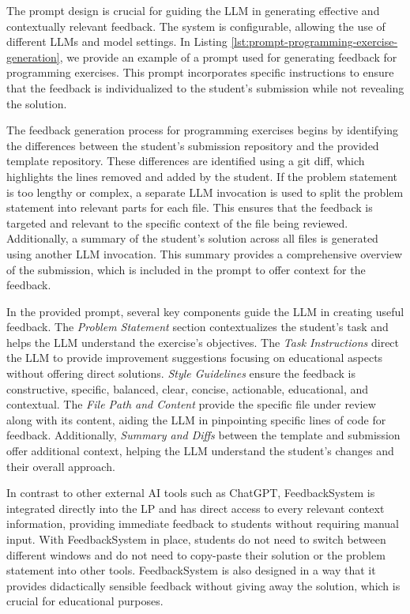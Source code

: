 \documentclass[sigconf,screen,review,anonymous]{acmart}
\begin{document}
The prompt design is crucial for guiding the LLM in generating effective and contextually relevant feedback.
The system is configurable, allowing the use of different LLMs and model settings. 
In Listing \ref{lst:prompt-programming-exercise-generation}, we provide an example of a prompt used for generating feedback for programming exercises. 
This prompt incorporates specific instructions to ensure that the feedback is individualized to the student's submission while not revealing the solution.

The feedback generation process for programming exercises begins by identifying the differences between the student's submission repository and the provided template repository. 
These differences are identified using a git diff, which highlights the lines removed and added by the student. 
If the problem statement is too lengthy or complex, a separate LLM invocation is used to split the problem statement into relevant parts for each file. 
This ensures that the feedback is targeted and relevant to the specific context of the file being reviewed. 
Additionally, a summary of the student's solution across all files is generated using another LLM invocation. 
This summary provides a comprehensive overview of the submission, which is included in the prompt to offer context for the feedback.

In the provided prompt, several key components guide the LLM in creating useful feedback. The \textit{Problem Statement} section contextualizes the student's task and helps the LLM understand the exercise's objectives.
The \textit{Task Instructions} direct the LLM to provide improvement suggestions focusing on educational aspects without offering direct solutions.
\textit{Style Guidelines} ensure the feedback is constructive, specific, balanced, clear, concise, actionable, educational, and contextual.
The \textit{File Path and Content} provide the specific file under review along with its content, aiding the LLM in pinpointing specific lines of code for feedback.
Additionally, \textit{Summary and Diffs} between the template and submission offer additional context, helping the LLM understand the student's changes and their overall approach.

In contrast to other external AI tools such as ChatGPT, FeedbackSystem is integrated directly into the LP and has direct access to every relevant context information, providing immediate feedback to students without requiring manual input.
With FeedbackSystem in place, students do not need to switch between different windows and do not need to copy-paste their solution or the problem statement into other tools. 
FeedbackSystem is also designed in a way that it provides didactically sensible feedback without giving away the solution, which is crucial for educational purposes.
\end{document}
